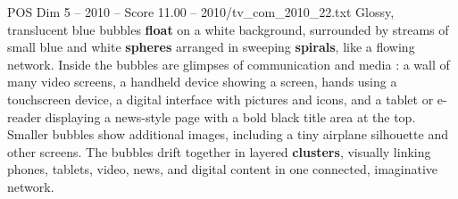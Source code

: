 \begin{textsample}{POS Dim 5 – 2010 – Score 11.00 – 2010/tv\_com\_2010\_22.txt}
Glossy, translucent blue bubbles \textbf{float} on a white background, surrounded by streams of small blue and white \textbf{spheres} arranged in sweeping \textbf{spirals}, like a flowing network.
Inside the bubbles are glimpses of communication and media : a wall of many video screens, a handheld device showing a screen, hands using a touchscreen device, a digital interface with pictures and icons, and a tablet or e-reader displaying a news-style page with a bold black title area at the top.
Smaller bubbles show additional images, including a tiny airplane silhouette and other screens.
The bubbles drift together in layered \textbf{clusters}, visually linking phones, tablets, video, news, and digital content in one connected, imaginative network.

\end{textsample}
